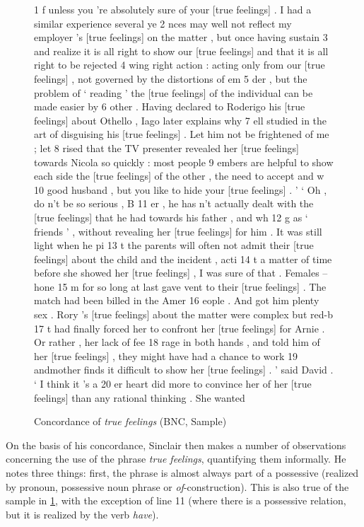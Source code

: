 \begin{figure}
\caption{Concordance of \textit{true feelings} (BNC, Sample)}
\label{fig:truefeelings}
\hrulefill
\begin{fitverb}
 1 f unless you 're absolutely sure of your [true feelings] . I had a similar experience several ye
 2 nces may well not reflect my employer 's [true feelings] on the matter , but once having sustain
 3  and realize it is all right to show our [true feelings] and that it is all right to be rejected
 4 wing right action : acting only from our [true feelings] , not governed by the distortions of em
 5 der , but the problem of ` reading ' the [true feelings] of the individual can be made easier by
 6  other . Having declared to Roderigo his [true feelings] about Othello , Iago later explains why
 7 ell studied in the art of disguising his [true feelings] . Let him not be frightened of me ; let
 8 rised that the TV presenter revealed her [true feelings] towards Nicola so quickly : most people
 9 embers are helpful to show each side the [true feelings] of the other , the need to accept and w
10 good husband , but you like to hide your [true feelings] . ' ` Oh , do n't be so serious , B
11  er , he has n't actually dealt with the [true feelings] that he had towards his father , and wh
12 g as ` friends ' , without revealing her [true feelings] for him . It was still light when he pi
13 t the parents will often not admit their [true feelings] about the child and the incident , acti
14 t a matter of time before she showed her [true feelings] , I was sure of that . Females -- hone
15 m for so long at last gave vent to their [true feelings] . The match had been billed in the Amer
16 eople . And got him plenty sex . Rory 's [true feelings] about the matter were complex but red-b
17 t had finally forced her to confront her [true feelings] for Arnie . Or rather , her lack of fee
18 rage in both hands , and told him of her [true feelings] , they might have had a chance to work
19 andmother finds it difficult to show her [true feelings] . ' said David . ` I think it 's a
20 er heart did more to convince her of her [true feelings] than any rational thinking . She wanted
\end{fitverb}
\hrulefill
\end{figure}

On the basis of his concordance,  Sinclair then makes a number of observations concerning the use of the phrase \textit{true feelings},  quantifying them informally. He notes three things: first, the phrase is almost always part of a possessive  (realized by pronoun,  possessive noun  phrase or \textit{of}-construction). This is also true of the sample in \ref{fig:truefeelings}, with the exception of line 11 (where there is a possessive relation, but it is realized by the verb  \textit{have}).

